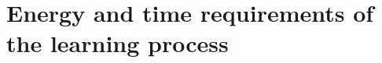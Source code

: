 
\section{Energy and time requirements of the learning process}\label{sec:energy_time_and_power_per_episode}



